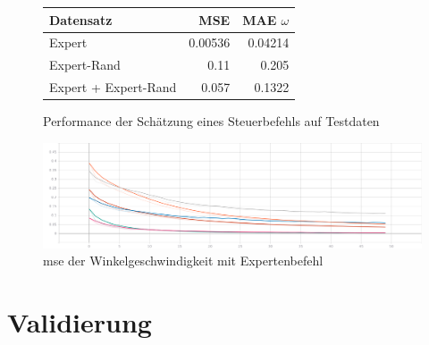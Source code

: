 \begin{figure}[H]
	\centering
	\begin{tabular}[t]{|l|r|r|}
		\hline
		Datensatz & MSE & MAE $\omega$ \\
		\hline
		Expert & 0.00536 & 0.04214 \\
		\hline
		Expert-Rand & 0.11 & 0.205 \\
		\hline
		Expert + Expert-Rand & 0.057 & 0.1322 \\
		\hline
	\end{tabular}
	\caption{Performance der Schätzung eines Steuerbefehls auf Testdaten}
	\label{expert-performance}
\end{figure}

\begin{figure}[H]
	\centering
	\includegraphics[width=\linewidth]{kapitel5/images/tensorboard/expert/Loss-expert.png}
	\caption{\acs{mse} der Winkelgeschwindigkeit mit Expertenbefehl}
	\label{expert-mse-omega}
\end{figure}


\section{Validierung}

